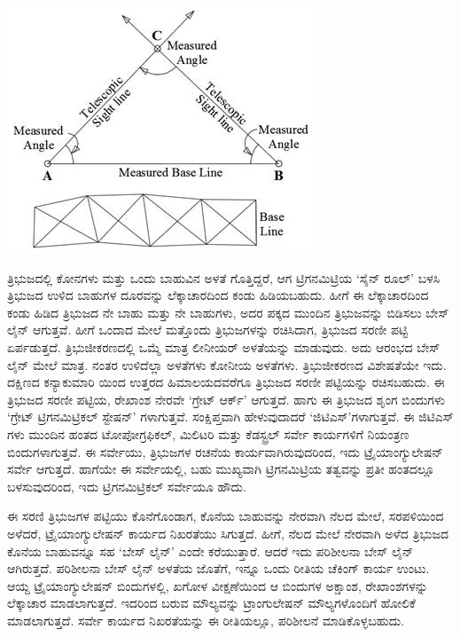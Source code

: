 \begin{center}
\includegraphics[scale=0.85]{"images/image003.jpg"}
\end{center}

ತ್ರಿಭುಜದಲ್ಲಿ  ಕೋನಗಳು ಮತ್ತು ಒಂದು ಬಾಹುವಿನ ಅಳತೆ ಗೊತ್ತಿದ್ದರೆ, ಆಗ ಟ್ರಿಗನಮಿಟ್ರಿಯ ‘ಸೈನ್​ ರೂಲ್​’ ಬಳಸಿ ತ್ರಿಭುಜದ ಉಳಿದ  ಬಾಹುಗಳ ದೂರವನ್ನು ಲೆಕ್ಕಾಚಾರದಿಂದ ಕಂಡು ಹಿಡಿಯಬಹುದು. ಹೀಗೆ ಈ ಲೆಕ್ಕಾಚಾರದಿಂದ ಕಂಡು ಹಿಡಿದ ತ್ರಿಭುಜದ ನೇ ಬಾಹು ಮತ್ತು ನೇ ಬಾಹುಗಳು, ಅದರ ಪಕ್ಕದ ಮುಂದಿನ ತ್ರಿಭುಜವನ್ನು ಬಿಡಿಸಲು ಬೇಸ್​ ಲೈನ್​ ಆಗುತ್ತವೆ. ಹೀಗೆ ಒಂದಾದ ಮೇಲೆ ಮತ್ತೊಂದು ತ್ರಿಭುಜಗಳನ್ನು ರಚಿಸಿದಾಗ, ತ್ರಿಭುಜದ ಸರಣೀ ಪಟ್ಟಿ ಏರ್ಪಡುತ್ತದೆ. ತ್ರಿಭುಜೀಕರಣದಲ್ಲಿ ಒಮ್ಮೆ ಮಾತ್ರ ಲೀನೀಯರ್​ ಅಳತೆಯನ್ನು ಮಾಡುವುದು. ಅದು ಆರಂಭದ ಬೇಸ್​ ಲೈನ್​ ಮೇಲೆ ಮಾತ್ರ. ನಂತರ ಉಳಿದೆಲ್ಲಾ ಅಳತೆಗಳು ಕೋನೀಯ ಅಳತೆಗಳು. ತ್ರಿಭುಜೀಕರಣದ ವಿಶೇಷತೆಯೇ ಇದು. ದಕ್ಷಿಣದ ಕನ್ಯಾಕುಮಾರಿ ಯಿಂದ ಉತ್ತರದ ಹಿಮಾಲಯದವರೆಗೂ ತ್ರಿಭುಜದ ಸರಣೀ ಪಟ್ಟಿಯನ್ನು ರಚಿಸಬಹುದು. ಈ ತ್ರಿಭುಜದ ಸರಣೀ ಪಟ್ಟಿಯ, ರೇಖಾಂಶ ನೇರವೇ ‘ಗ್ರೇಟ್​ ಆರ್ಕ್’ ಆಗುತ್ತದೆ. ಹಾಗು ಈ ತ್ರಿಭುಜದ ಶೃಂಗ ಬಿಂದುಗಳು ‘ಗ್ರೇಟ್​ ಟ್ರಿಗನಮಿಟ್ರಿಕಲ್​ ಸ್ಟೇಷನ್​’ ಗಳಾಗುತ್ತವೆ. ಸಂಕ್ಷಿಪ್ತವಾಗಿ ಹೇಳುವುದಾದರೆ ‘ಜಿಟಿಎಸ್​’ಗಳಾಗುತ್ತವೆ. ಈ ಜಿಟಿಎಸ್​ಗಳು ಮುಂದಿನ ಹಂತದ ಟೋಪೋಗ್ರಫಿಕಲ್​, ಮಿಲಿಟರಿ ಮತ್ತು ಕೆಡಸ್ಟ್ರಲ್​ ಸರ್ವೇ ಕಾರ್ಯಗಳಿಗೆ ನಿಯಂತ್ರಣ ಬಿಂದುಗಳಾಗುತ್ತವೆ. ಈ ಸರ್ವೇಯು, ತ್ರಿಭುಜಗಳ ರಚನೆಯ ಕಾರ್ಯವಾಗಿರುವುದರಿಂದ, ಇದು ಟ್ರೈಯಾಂಗ್ಯುಲೇಷನ್​ ಸರ್ವೇ ಆಗುತ್ತದೆ. ಹಾಗೆಯೇ ಈ ಸರ್ವೇಯಲ್ಲಿ, ಬಹು ಮುಖ್ಯವಾಗಿ ಟ್ರಿಗನಮಿಟ್ರಿಯ ತತ್ವವನ್ನು ಪ್ರತೀ ಹಂತದಲ್ಲೂ ಬಳಸುವುದರಿಂದ, ಇದು ಟ್ರಿಗನಮಿಟ್ರಿಕಲ್​ ಸರ್ವೇಯೂ ಹೌದು.

\newpage

ಈ ಸರಣಿ ತ್ರಿಭುಜಗಳ ಪಟ್ಟಿಯು ಕೊನೆಗೊಂಡಾಗ, ಕೊನೆಯ ಬಾಹುವನ್ನು ನೇರವಾಗಿ ನೆಲದ ಮೇಲೆ, ಸರಪಳಿಯಿಂದ ಅಳೆದರೆ, ಟ್ರೈಯಾಂಗ್ಯುಲೇಷನ್​ ಕಾರ್ಯದ ನಿಖರತೆಯು ಸಿಗುತ್ತದೆ. ಹೀಗೆ, ನೆಲದ ಮೇಲೆ ನೇರವಾಗಿ ಅಳೆದ ತ್ರಿಭುಜದ ಕೊನೆಯ ಬಾಹುವನ್ನೂ ಸಹ ‘ಬೇಸ್​ ಲೈನ್​’ ಎಂದೇ ಕರೆಯುತ್ತಾರೆ. ಆದರೆ ಇದು ಪರಿಶೀಲನಾ ಬೇಸ್​ ಲೈನ್​ ಆಗಿರುತ್ತದೆ. ಪರಿಶೀಲನಾ ಬೇಸ್​ ಲೈನ್​ ಅಳತೆಯ ಜೊತೆಗೆ, ಇನ್ನೂ ಒಂದು ರೀತಿಯ ಚೆಕಿಂಗ್​ ಕಾರ್ಯ ಉಂಟು. ಆಯ್ದ ಟ್ರೈಯಾಂಗ್ಯುಲೇಷನ್​ ಬಿಂದುಗಳಲ್ಲಿ, ಖಗೋಳ ವೀಕ್ಷಣೆಯಿಂದ ಆ ಬಿಂದುಗಳ ಅಕ್ಷಾಂಶ, ರೇಖಾಂಶಗಳನ್ನು ಲೆಕ್ಕಾಚಾರ ಮಾಡಲಾಗುತ್ತದೆ. ಇದರಿಂದ ಬರುವ ಮೌಲ್ಯವನ್ನು ಟ್ರಾಂಗುಲೇಷನ್​ ಮೌಲ್ಯಗಳೊಂದಿಗೆ ಹೋಲಿಕೆ ಮಾಡಲಾಗುತ್ತದೆ. ಸರ್ವೇ ಕಾರ್ಯದ ನಿಖರತೆಯನ್ನು ಈ ರೀತಿಯಲ್ಲೂ, ಪರಿಶೀಲನೆ ಮಾಡಿಕೊಳ್ಳಬಹುದು.

